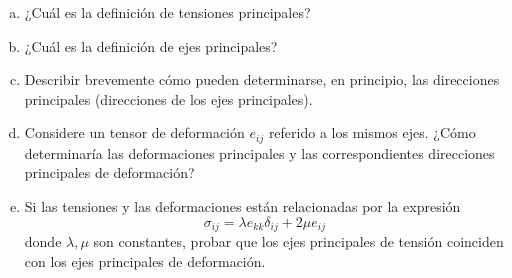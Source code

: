 \documentclass[a4paper,10pt,twoside,final,spanish]{article}
\begin{document}
\begin{enumerate}[a.]
\item ¿Cuál es la definición de tensiones principales?
\item ¿Cuál es la definición de ejes principales?
\item Describir brevemente cómo pueden determinarse, en principio, las direcciones principales (direcciones de los ejes principales).
\item Considere un tensor de deformación $e_{ij}$ referido a los mismos ejes. ¿Cómo determinaría las deformaciones principales y las correspondientes direcciones 
principales de deformación?
\item Si las tensiones y las deformaciones están relacionadas por la expresión
\[
\sigma_{ij}=\lambda e_{kk}\delta_{ij}+2\mu e_{ij}
\]
donde $\lambda,\mu$ son constantes, probar que los ejes principales de tensión coinciden con los ejes principales de deformación.
\end{enumerate}
 
\dotfill
\end{document}
